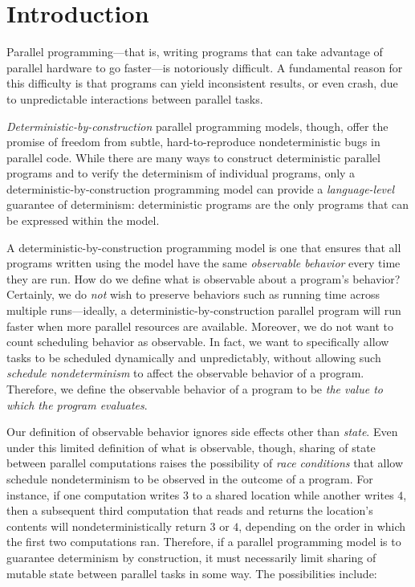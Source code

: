 \chapter{Introduction\label{ch:intro}} %

Parallel programming---that is, writing programs that can take
advantage of parallel hardware to go faster---is notoriously
difficult.  A fundamental reason for this difficulty is that programs
can yield inconsistent results, or even crash, due to unpredictable
interactions between parallel tasks.

\emph{Deterministic-by-construction} parallel programming models,
though, offer the promise of freedom from subtle, hard-to-reproduce
nondeterministic bugs in parallel code.  While there are many ways to
construct deterministic parallel programs and to verify the
determinism of individual programs, only a
deterministic-by-construction programming model can provide a
\emph{language-level} guarantee of determinism:
deterministic programs are the only programs that can be expressed
within the model.

A deterministic-by-construction programming model is one that ensures
that all programs written using the model have the same
\emph{observable behavior} every time they are run.  How do we define
what is observable about a program's behavior?  Certainly, we do
\emph{not} wish to preserve behaviors such as running time across
multiple runs---ideally, a deterministic-by-construction parallel
program will run faster when more parallel resources are available.
Moreover, we do not want to count scheduling behavior as observable.
In fact, we want to specifically allow tasks to be scheduled
dynamically and unpredictably, without allowing such \emph{schedule
  nondeterminism} to affect the observable behavior of a program.
Therefore, we define the observable behavior of a program to be
\emph{the value to which the program evaluates}.


Our definition of observable behavior ignores side effects other than
\emph{state}.  Even under this limited definition of what is
observable, though, sharing of state between parallel computations
raises the possibility of \emph{race conditions} that allow schedule
nondeterminism to be observed in the outcome of a program.  For
instance, if one computation writes $3$ to a shared location while
another writes $4$, then a subsequent third computation that reads and
returns the location's contents will nondeterministically return $3$
or $4$, depending on the order in which the first two computations
ran.  Therefore, if a parallel programming model is to guarantee
determinism by construction, it must necessarily limit sharing of
mutable state between parallel tasks in some way.
The possibilities include:

